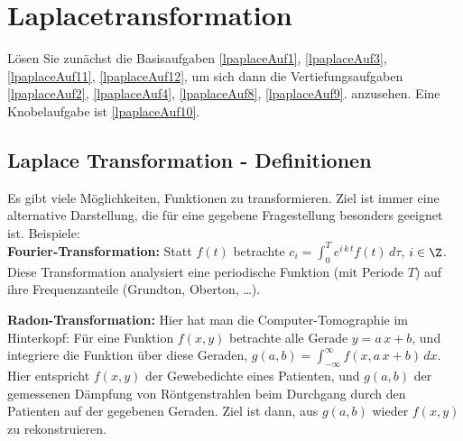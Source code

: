 


\section{Laplacetransformation}
\par\medskip
L\"osen Sie zun\"achst die Basisaufgaben 
\ref{lpaplaceAuf1}, \ref{lpaplaceAuf3},  \ref{lpaplaceAuf11},  \ref{lpaplaceAuf12}, 
um sich dann die Vertiefungsaufgaben \ref{lpaplaceAuf2},  \ref{lpaplaceAuf4},  \ref{lpaplaceAuf8}, \ref{lpaplaceAuf9}. 
anzusehen. Eine Knobelaufgabe ist \ref{lpaplaceAuf10}.


\subsection{Laplace Transformation - Definitionen}
Es gibt viele M\"oglichkeiten, Funktionen zu transformieren. Ziel ist immer eine 
alternative Darstellung, die f\"ur eine gegebene Fragestellung besonders geeignet ist.
Beispiele:\\
{\bf Fourier-Transformation:} Statt $f(t)$ betrachte 
$c_i = \int_0^T e^{i\, k\, t} f(t)\, d\tau$, $i\in\Z$.\\
Diese Transformation analysiert eine periodische Funktion (mit Periode $T$) 
auf ihre Frequenzanteile (Grundton, Oberton, \ldots).\par\medskip
{\bf Radon-Transformation:} Hier hat man die Computer-Tomographie im Hinterkopf: F\"ur eine Funktion 
$f(x,y)$ betrachte alle Gerade $y=a\,x+b$, und integriere die Funktion \"uber diese Geraden, 
$g(a,b) = \int_{-\infty}^\infty f(x,a\,x+b)\, dx$. Hier entspricht $f(x,y)$ der Gewebedichte
eines Patienten, und $g(a,b)$ der gemessenen D\"ampfung von R\"ontgenstrahlen beim 
Durchgang durch den Patienten auf der gegebenen Geraden. Ziel ist dann, aus $g(a,b)$ wieder $f(x,y)$ 
zu rekonstruieren.\par\medskip

